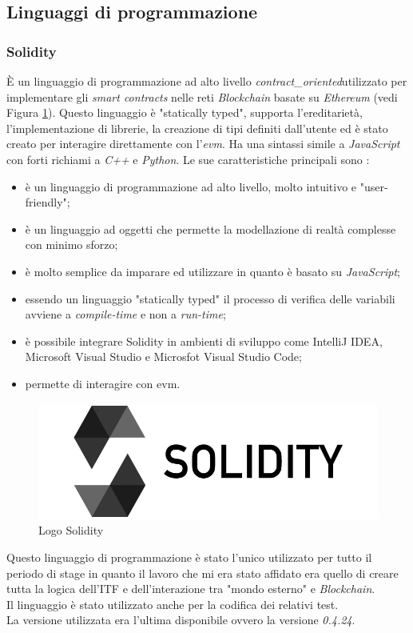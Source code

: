 \subsection{Linguaggi di programmazione}
\subsubsection{Solidity}
È un linguaggio di programmazione ad alto livello \emph{\gls{contract_oriented}}\glsfirstoccur  utilizzato per implementare gli \textit{smart contracts} nelle reti \textit{Blockchain} basate su \textit{Ethereum} (vedi Figura \ref{img:solidity}).
Questo linguaggio è "statically typed", supporta l'ereditarietà, l'implementazione di librerie, la creazione di tipi definiti dall'utente ed è stato creato per interagire direttamente con l'\emph{\gls{evm}}\glsfirstoccur. 
Ha una sintassi simile a \textit{JavaScript} con forti richiami a \textit{C++} e \textit{Python}\cite{solidity}.
Le sue caratteristiche principali sono \cite{solidity}:
\begin{itemize}
	\item è un linguaggio di programmazione ad alto livello, molto intuitivo e "user-friendly";
	\item è un linguaggio ad oggetti che permette la modellazione di realtà complesse con minimo sforzo;
	\item è molto semplice da imparare ed utilizzare in quanto è basato su \textit{JavaScript};
	\item essendo un linguaggio "statically typed" il processo di verifica delle variabili avviene a \textit{compile-time} e non a \textit{run-time};
	\item è possibile integrare Solidity in ambienti di sviluppo come IntelliJ IDEA, Microsoft Visual Studio e Microsfot Visual Studio Code;
	\item permette di interagire con \gls{evm}.
\end{itemize}
\begin{figure}[h]
	\centering
	\includegraphics[scale=0.25]{immagini/solidity}
	\caption{Logo Solidity}
	\label{img:solidity}
\end{figure}
Questo linguaggio di programmazione è stato l'unico utilizzato per tutto il periodo di stage in quanto il lavoro che mi era stato affidato era quello di creare tutta la logica dell'\gls{ITF} e dell'interazione tra "mondo esterno" e \textit{Blockchain}.\\
Il linguaggio è stato utilizzato anche per la codifica dei relativi test.\\
La versione utilizzata era l'ultima disponibile ovvero la versione \textit{0.4.24}.
